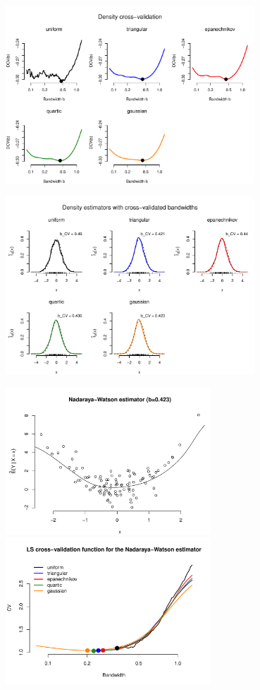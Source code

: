 \documentclass[11pt, a4paper]{article}
\begin{document}
\begin{center}
\includegraphics[width=0.7\textwidth]{output/14-DCV.pdf}

\includegraphics[width=0.7\textwidth]{output/15-density-optimal.pdf}

\includegraphics[height=5.5cm]{output/16-NW-estimator-optimal.pdf}\includegraphics[height=5.5cm]{output/17-LSCV.pdf}


\end{center}
\end{document}
